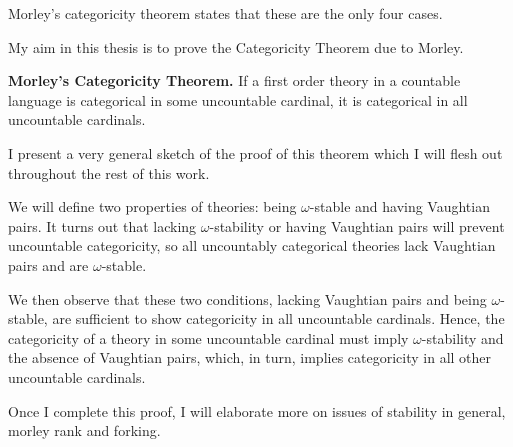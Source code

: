 Morley's categoricity theorem states that these are the only four cases. 

My aim in this thesis is to prove the Categoricity Theorem due to Morley. 

\textbf{Morley's Categoricity Theorem.} If a first order theory in a countable language is categorical in some uncountable cardinal, it is categorical in all uncountable cardinals. 

I present a very general sketch of the proof of this theorem which I will flesh out throughout the rest of this work. 

We will define two properties of theories: being \(\omega\)-stable and having Vaughtian pairs. It turns out that lacking \(\omega\)-stability or having Vaughtian pairs will prevent uncountable categoricity, so all uncountably categorical theories lack Vaughtian pairs and are \(\omega\)-stable. 

We then observe that these two conditions, lacking Vaughtian pairs and being \(\omega\)-stable, are sufficient to show categoricity in all uncountable cardinals. Hence, the categoricity of a theory in some uncountable cardinal must imply \(\omega\)-stability and the absence of Vaughtian pairs, which, in turn, implies categoricity in all other uncountable cardinals. 

Once I complete this proof, I will elaborate more on issues of stability in general, morley rank and forking.  
